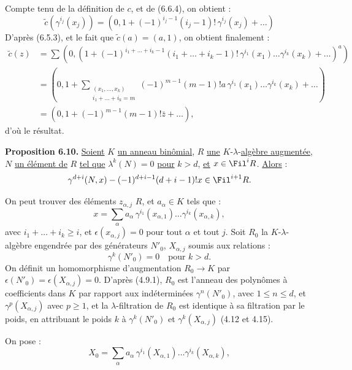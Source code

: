 
Compte tenu de la définition de \(c\), et de (6.6.4), on obtient :
\[
  \widetilde c(\gamma^{i_j}(x_j))
  =
  \left(0,1+(-1)^{i_j-1}(i_j-1)!\,\gamma^{i_j}(x_j)+\ldots\right)
\]
D'après (6.5.3), et le fait que \(\widetilde c(a)=(a,1)\), on obtient finalement :
\[
\begin{aligned}
\widetilde c(z)
&=\sum
\left(0,\left(1+
(-1)^{i_1+\ldots+i_k-1}
(i_1+\ldots+i_k-1)!
\,\gamma^{i_1}(x_1)\ldots\gamma^{i_k}(x_k)
+\ldots\right)^a\right)\\
&=
\left(0,1+
\sum_{\substack{(x_1,\ldots,x_k)\\ i_1+\ldots+i_k=m}}
(-1)^{m-1}(m-1)!a\,\gamma^{i_1}(x_1)\ldots\gamma^{i_k}(x_k)
+\ldots\right)\\
&=
(0,1+(-1)^{m-1}(m-1)!\bar z+\ldots),
\end{aligned}
\]
d'où le résultat.

\textbf{Proposition 6.10.} \uline{Soient} \(K\) \uline{un anneau binômial}, \(R\) \uline{une} \(K\)-\(\lambda\)-\uline{algèbre augmentée}, \(N\) \uline{un élément de} \(R\) \uline{tel que} \(\lambda^k(N)=0\) \uline{pour} \(k>d\), \uline{et} \(x\in\Fil^iR\). \uline{Alors} :
\[
  \gamma^{d+i}(N,x)-(-1)^{d+i-1}(d+i-1)!x\in\Fil^{i+1}R.
\]

On peut trouver des éléments \(z_{\alpha,j}\) \(R\), et \(a_\alpha\in K\) tels que :
\[
  x=\sum_\alpha a_\alpha\,
       \gamma^{i_1}(x_{\alpha,1})\ldots
       \gamma^{i_k}(x_{\alpha,k}),
\]
avec \(i_1+\ldots+i_k\ge i\), et \(\epsilon(x_{\alpha,j})=0\) pour tout \(\alpha\) et tout \(j\). Soit \(R_0\) la \(K\)-\(\lambda\)-algèbre engendrée par des générateurs \(N'_0\), \(X_{\alpha,j}\) soumis aux relations :
\[
  \gamma^k(N'_0)=0\quad\text{pour }k>d.
\]
On définit un homomorphisme d'augmentation \(R_0\to K\) par \(\epsilon(N'_0)=\epsilon(X_{\alpha,j})=0\). D'après (4.9.1), \(R_0\) est l'anneau des polynômes à coefficients dans \(K\) par rapport aux indéterminées \(\gamma^n(N'_0)\), avec \(1\le n\le d\), et \(\gamma^p(X_{\alpha,j})\) avec \(p\ge1\), et la \(\lambda\)-filtration de \(R_0\) est identique à sa filtration par le poids, en attribuant le poids \(k\) à \(\gamma^k(N'_0)\) et \(\gamma^k(X_{\alpha,j})\) (4.12 et 4.15).

On pose :
\[
  X_0=\sum_\alpha a_\alpha\,
       \gamma^{i_1}(X_{\alpha,1})\ldots
       \gamma^{i_k}(X_{\alpha,k}),
\]
